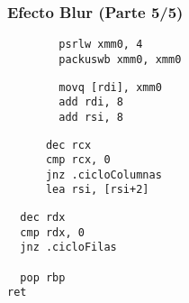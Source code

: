 \documentclass[aspectratio=169]{beamer}
\begin{document}
\begin{frame}[fragile]
    \frametitle{Efecto Blur (Parte 5/5)}
    \footnotesize
\begin{verbatim}
        psrlw xmm0, 4
        packuswb xmm0, xmm0
\end{verbatim}
\pause
\begin{verbatim}
        movq [rdi], xmm0
        add rdi, 8
        add rsi, 8
\end{verbatim}
\pause
\begin{verbatim}
      dec rcx
      cmp rcx, 0
      jnz .cicloColumnas
      lea rsi, [rsi+2]
\end{verbatim}
\pause
\begin{verbatim}
  dec rdx
  cmp rdx, 0
  jnz .cicloFilas

  pop rbp
ret

\end{verbatim}
\end{frame}
\end{document}
